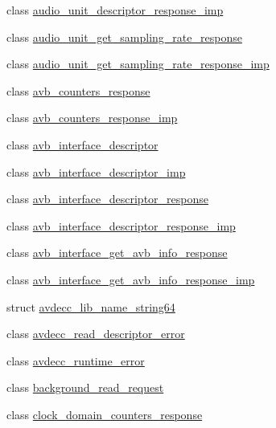 \begin{DoxyCompactItemize}
\item 
class \hyperlink{classavdecc__lib_1_1audio__unit__descriptor__response__imp}{audio\+\_\+unit\+\_\+descriptor\+\_\+response\+\_\+imp}
\item 
class \hyperlink{classavdecc__lib_1_1audio__unit__get__sampling__rate__response}{audio\+\_\+unit\+\_\+get\+\_\+sampling\+\_\+rate\+\_\+response}
\item 
class \hyperlink{classavdecc__lib_1_1audio__unit__get__sampling__rate__response__imp}{audio\+\_\+unit\+\_\+get\+\_\+sampling\+\_\+rate\+\_\+response\+\_\+imp}
\item 
class \hyperlink{classavdecc__lib_1_1avb__counters__response}{avb\+\_\+counters\+\_\+response}
\item 
class \hyperlink{classavdecc__lib_1_1avb__counters__response__imp}{avb\+\_\+counters\+\_\+response\+\_\+imp}
\item 
class \hyperlink{classavdecc__lib_1_1avb__interface__descriptor}{avb\+\_\+interface\+\_\+descriptor}
\item 
class \hyperlink{classavdecc__lib_1_1avb__interface__descriptor__imp}{avb\+\_\+interface\+\_\+descriptor\+\_\+imp}
\item 
class \hyperlink{classavdecc__lib_1_1avb__interface__descriptor__response}{avb\+\_\+interface\+\_\+descriptor\+\_\+response}
\item 
class \hyperlink{classavdecc__lib_1_1avb__interface__descriptor__response__imp}{avb\+\_\+interface\+\_\+descriptor\+\_\+response\+\_\+imp}
\item 
class \hyperlink{classavdecc__lib_1_1avb__interface__get__avb__info__response}{avb\+\_\+interface\+\_\+get\+\_\+avb\+\_\+info\+\_\+response}
\item 
class \hyperlink{classavdecc__lib_1_1avb__interface__get__avb__info__response__imp}{avb\+\_\+interface\+\_\+get\+\_\+avb\+\_\+info\+\_\+response\+\_\+imp}
\item 
struct \hyperlink{structavdecc__lib_1_1avdecc__lib__name__string64}{avdecc\+\_\+lib\+\_\+name\+\_\+string64}
\item 
class \hyperlink{classavdecc__lib_1_1avdecc__read__descriptor__error}{avdecc\+\_\+read\+\_\+descriptor\+\_\+error}
\item 
class \hyperlink{classavdecc__lib_1_1avdecc__runtime__error}{avdecc\+\_\+runtime\+\_\+error}
\item 
class \hyperlink{classavdecc__lib_1_1background__read__request}{background\+\_\+read\+\_\+request}
\item 
class \hyperlink{classavdecc__lib_1_1clock__domain__counters__response}{clock\+\_\+domain\+\_\+counters\+\_\+response}

\end{DoxyCompactItemize}
